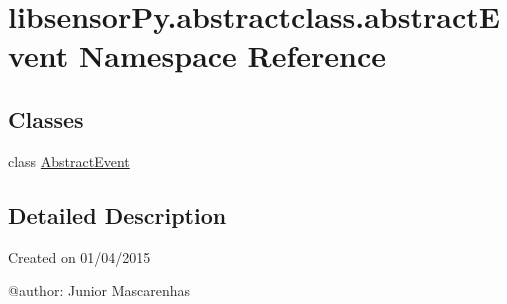 \hypertarget{namespacelibsensorPy_1_1abstractclass_1_1abstractEvent}{}\section{libsensor\+Py.\+abstractclass.\+abstract\+Event Namespace Reference}
\label{namespacelibsensorPy_1_1abstractclass_1_1abstractEvent}
\subsection*{Classes}
\begin{DoxyCompactItemize}
\item 
class \hyperlink{classlibsensorPy_1_1abstractclass_1_1abstractEvent_1_1AbstractEvent}{Abstract\+Event}
\end{DoxyCompactItemize}


\subsection{Detailed Description}
\begin{DoxyVerb}Created on 01/04/2015

@author: Junior Mascarenhas
\end{DoxyVerb}
 